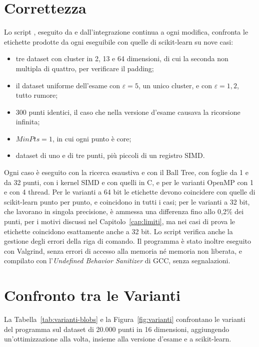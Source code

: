 \section{Correttezza}

Lo script , eseguito da  e dall'integrazione continua a ogni modifica, confronta le etichette prodotte da ogni eseguibile con quelle di scikit-learn su nove casi:

\begin{itemize}
    \item tre dataset con cluster in 2, 13 e 64 dimensioni, di cui la seconda non multipla di quattro, per verificare il padding;
    \item il dataset uniforme dell'esame con $\varepsilon = 5$, un unico cluster, e con $\varepsilon = 1{,}2$, tutto rumore;
    \item 300 punti identici, il caso che nella versione d'esame causava la ricorsione infinita;
    \item $\textit{MinPts} = 1$, in cui ogni punto è core;
    \item dataset di uno e di tre punti, più piccoli di un registro SIMD.
\end{itemize}

Ogni caso è eseguito con la ricerca esaustiva e con il Ball Tree, con foglie da 1 e da 32 punti, con i kernel SIMD e con quelli in C, e per le varianti OpenMP con 1 e con 4 thread. Per le varianti a 64 bit le etichette devono coincidere con quelle di scikit-learn punto per punto, e coincidono in tutti i casi; per le varianti a 32 bit, che lavorano in singola precisione, è ammessa una differenza fino allo 0,2\% dei punti, per i motivi discussi nel Capitolo~\ref{cap:limiti}, ma nei casi di prova le etichette coincidono esattamente anche a 32 bit. Lo script verifica anche la gestione degli errori della riga di comando. Il programma è stato inoltre eseguito con Valgrind, senza errori di accesso alla memoria né memoria non liberata, e compilato con l'\emph{Undefined Behavior Sanitizer} di GCC, senza segnalazioni.

\section{Confronto tra le Varianti}
\label{sec:varianti}

La Tabella~\ref{tab:varianti-blobs} e la Figura~\ref{fig:varianti} confrontano le varianti del programma sul dataset di 20.000 punti in 16 dimensioni, aggiungendo un'ottimizzazione alla volta, insieme alla versione d'esame e a scikit-learn.

